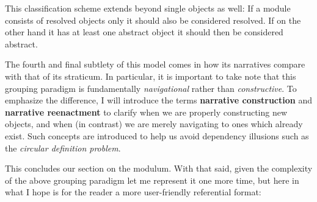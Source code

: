 \documentclass[twoside]{article}
\newcommand{\strong}[1]{{\bfseries #1}}
\begin{document}
This classification scheme extends beyond single objects as well: If a module consists of resolved objects only it should also
be considered resolved. If on the other hand it has at least one abstract object it should then be considered abstract.

The fourth and final subtlety of this model comes in how its narratives compare with that of its straticum. In particular,
it is important to take note that this grouping paradigm is fundamentally \emph{navigational} rather than \emph{constructive}.
To emphasize the difference, I will introduce the terms \strong{narrative construction} and \strong{narrative reenactment}
to clarify when we are properly constructing new objects, and when (in contrast) we are merely navigating to ones which already
exist. Such concepts are introduced to help us avoid dependency illusions such as the \emph{circular definition problem}.

This concludes our section on the modulum. With that said, given the complexity of the above grouping paradigm let
me represent it one more time, but here in what I hope is for the reader a more user-friendly referential format:
\end{document}
